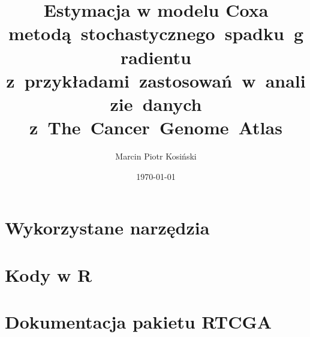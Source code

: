 \documentclass[]{mini}
\title{Estymacja w modelu Coxa metodą~stochastycznego~spadku~gradientu z~przykładami~zastosowań~w~analizie~danych z~The~Cancer~Genome~Atlas}
\author{Marcin Piotr Kosiński}
\date{\today}
\begin{document}
\maketitle
\tableofcontents













\appendix

\chapter{Wykorzystane narzędzia}
\chapter{Kody w R}
\chapter{Dokumentacja pakietu RTCGA}





\makestatement
\end{document}
